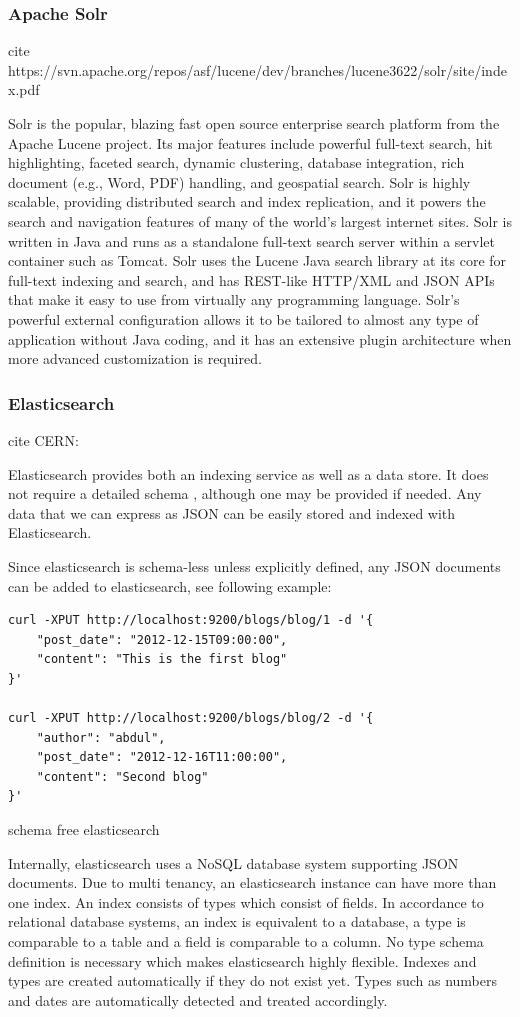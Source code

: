 \subsubsection{Apache Solr \label{sec:back_se_solr}}
cite https://svn.apache.org/repos/asf/lucene/dev/branches/lucene3622/solr/site/index.pdf

Solr is the popular, blazing fast open source enterprise search platform from the Apache Lucene project. Its major features include powerful full-text search, hit highlighting, faceted search, dynamic clustering, database integration, rich document (e.g., Word, PDF) handling, and geospatial search. Solr is highly scalable, providing distributed search and index replication, and it powers the search and navigation features of many of the world's largest internet sites.
Solr is written in Java and runs as a standalone full-text search server within a servlet container such as Tomcat. Solr uses the Lucene Java search library at its core for full-text indexing and search, and has REST-like HTTP/XML and JSON APIs that make it easy to use from virtually any programming language. Solr's powerful external configuration allows it to be tailored to almost any type of application without Java coding, and it has an extensive plugin architecture when more advanced customization is required.

\subsubsection{Elasticsearch \label{sec:back_se_es}}
cite CERN:

Elasticsearch provides both an indexing service as well as a data store. It does not require a
detailed schema , although one may be provided if needed. Any data that we can express as
JSON can be easily stored and indexed with Elasticsearch.

Since elasticsearch is schema-less unless explicitly defined, any JSON documents can be added to elasticsearch, see following example:
 
\begin{code}
\begin{verbatim}
curl -XPUT http://localhost:9200/blogs/blog/1 -d '{
    "post_date": "2012-12-15T09:00:00",
    "content": "This is the first blog"
}'

curl -XPUT http://localhost:9200/blogs/blog/2 -d '{
    "author": "abdul",
    "post_date": "2012-12-16T11:00:00",
    "content": "Second blog"
}'
\end{verbatim}
\caption{schema free elasticsearch}
\label{lst:elasticsearch_schema-free}
\end{code}
Internally, elasticsearch uses a NoSQL database system supporting JSON documents. Due to multi
tenancy, an elasticsearch instance can have more than one index. An index consists of types which
consist of fields. In accordance to relational database systems, an index is equivalent to a database, a
type is comparable to a table and a field is comparable to a column. No type schema definition is
necessary which makes elasticsearch highly flexible. Indexes and types are created automatically if
they do not exist yet. Types such as numbers and dates are automatically detected and treated accordingly.

